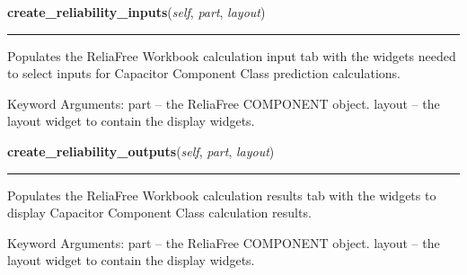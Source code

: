     \label{reliafree:capacitors:capacitor:Capacitor:create_reliability_inputs}

    \vspace{0.5ex}

\hspace{.8\funcindent}\begin{boxedminipage}{\funcwidth}

    \raggedright \textbf{create\_reliability\_inputs}(\textit{self}, \textit{part}, \textit{layout})

    \vspace{-1.5ex}

    \rule{\textwidth}{0.5\fboxrule}
\setlength{\parskip}{2ex}
    Populates the ReliaFree Workbook calculation input tab with the widgets
    needed to select inputs for Capacitor Component Class prediction 
    calculations.

    Keyword Arguments: part   -- the ReliaFree COMPONENT object. layout -- 
    the layout widget to contain the display widgets.

\setlength{\parskip}{1ex}
    \end{boxedminipage}

    \label{reliafree:capacitors:capacitor:Capacitor:create_reliability_outputs}

    \vspace{0.5ex}

\hspace{.8\funcindent}\begin{boxedminipage}{\funcwidth}

    \raggedright \textbf{create\_reliability\_outputs}(\textit{self}, \textit{part}, \textit{layout})

    \vspace{-1.5ex}

    \rule{\textwidth}{0.5\fboxrule}
\setlength{\parskip}{2ex}
    Populates the ReliaFree Workbook calculation results tab with the 
    widgets to display Capacitor Component Class calculation results.

    Keyword Arguments: part   -- the ReliaFree COMPONENT object. layout -- 
    the layout widget to contain the display widgets.

\setlength{\parskip}{1ex}
    \end{boxedminipage}

